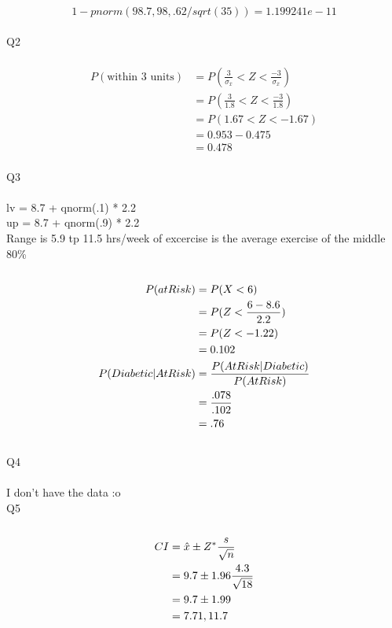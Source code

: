 \documentclass{article}
\begin{document}
\begin{equation*}
1- pnorm(98.7, 98, .62/sqrt(35)) = 1.199241e-11
\end{equation*}
\\

Q2\\\\

\begin{equation*}
\begin{split}
P(\textrm{within 3 units}) & = P(\frac{3}{\sigma_{\overline{x}}} < Z < \frac{-3}{\sigma_{\overline{x}}})\\
& = P(\frac{3}{1.8} < Z < \frac{-3}{1.8})\\
& = P(1.67 < Z < -1.67)\\
& = 0.953 - 0.475\\
& = 0.478
\end{split}
\end{equation*}
\\

Q3\\\\
lv = 8.7 + qnorm(.1) * 2.2\\
up = 8.7 + qnorm(.9) * 2.2\\
Range is 5.9 tp 11.5 hrs/week of excercise is the average exercise of the middle 80\%\\
\\

\begin{equation*}
\begin{split}
P(at Risk) & = P(X< 6)\\
& = P(Z <{6 - 8.6 \over 2.2} )\\
& = P(Z < -1.22)\\
& = 0.102 \\
P(Diabetic | At Risk) & = {P(At Risk | Diabetic) \over P(At Risk)} \\
& = {.078 \over .102}\\
& = .76
\end{split}
\end{equation*}
\\

Q4\\\\
I don't have the data :o\\

Q5\\\\
\begin{equation*}
\begin{split}
CI & = \hat{x} \pm Z^* {s \over \sqrt{n}}\\
& = 9.7 \pm 1.96 {4.3 \over  \sqrt{18}}\\
& = 9.7 \pm 1.99\\
& = 7.71, 11.7
\end{split}
\end{equation*}
\\
\end{document}
